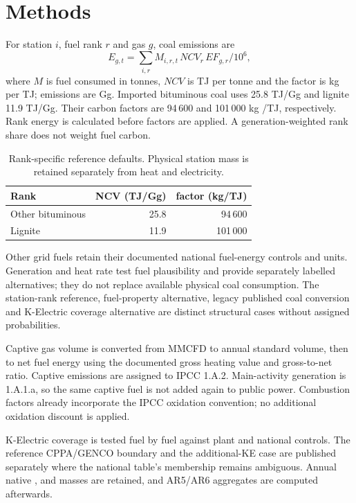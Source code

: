 \section{Methods}
\label{sec:methods}
For station $i$, fuel rank $r$ and gas $g$, coal emissions are
\begin{equation}
E_{g,t}=\sum_{i,r} M_{i,r,t}\,NCV_r\,EF_{g,r}/10^6,
\end{equation}
where $M$ is fuel consumed in tonnes, $NCV$ is TJ per tonne and the factor is kg per TJ; emissions are Gg. Imported bituminous coal uses 25.8 TJ/Gg and lignite 11.9 TJ/Gg. Their carbon factors are 94\,600 and 101\,000 kg \COtwo{}/TJ, respectively. Rank energy is calculated before factors are applied. A generation-weighted rank share does not weight fuel carbon.

\begin{table}[htbp]
\centering\small
\begin{tabular}{@{}lrr@{}}\toprule
Rank & NCV (TJ/Gg) & \COtwo{} factor (kg/TJ)\\\midrule
Other bituminous & 25.8 & 94\,600\\
Lignite & 11.9 & 101\,000\\\bottomrule
\end{tabular}
\caption{Rank-specific reference defaults. Physical station mass is retained separately from heat and electricity.}\label{tab:coals}
\end{table}

Other grid fuels retain their documented national fuel-energy controls and units. Generation and heat rate test fuel plausibility and provide separately labelled alternatives; they do not replace available physical coal consumption. The station-rank reference, fuel-property alternative, legacy published coal conversion and K-Electric coverage alternative are distinct structural cases without assigned probabilities.

Captive gas volume is converted from MMCFD to annual standard volume, then to net fuel energy using the documented gross heating value and gross-to-net ratio. Captive emissions are assigned to IPCC 1.A.2. Main-activity generation is 1.A.1.a, so the same captive fuel is not added again to public power. Combustion factors already incorporate the IPCC oxidation convention; no additional oxidation discount is applied.

K-Electric coverage is tested fuel by fuel against plant and national controls. The reference CPPA/GENCO boundary and the additional-KE case are published separately where the national table's membership remains ambiguous. Annual native \COtwo{}, \CHfour{} and \NtwoO{} masses are retained, and AR5/AR6 aggregates are computed afterwards.
